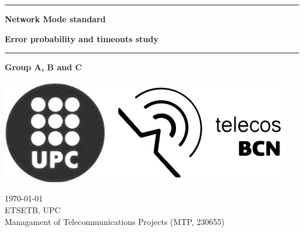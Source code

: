 \begin{titlepage}
	\begin{center}
		\vspace*{1cm} %
		
		\huge

	\hrule
		\textbf{Network Mode standard}
		\vspace{0.5cm}

		\Large
		\textbf{Error probability and timeouts study}

		\vspace{0.5cm}
	\hrule
		
		\vspace{2cm}
		\large

		\textbf{Group A, B and C}

		\vspace{6cm}
		\includegraphics[scale=0.35]{./titlepage/upc-telecos-bw.png}

		
		\vfill

	\end{center}
	
	\begin{flushright}
		\large	
		\UKvardate \today \\ %
		ETSETB, UPC \\ %
		Managament of Telecommunications Projects (MTP, 230655)
	\end{flushright}

\end{titlepage} 
